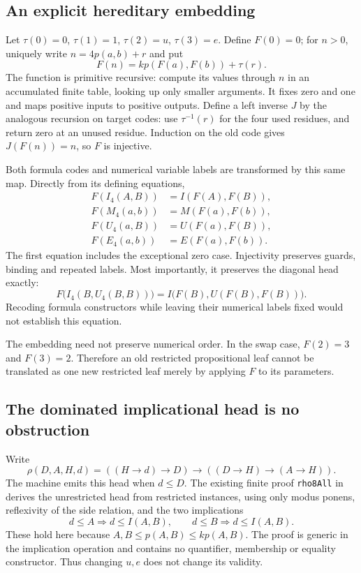 \subsection{An explicit hereditary embedding}

Let $\tau(0)=0$, $\tau(1)=1$, $\tau(2)=u$, $\tau(3)=e$. Define $F(0)=0$;
for $n>0$, uniquely write $n=4p(a,b)+r$ and put
\[
 F(n)=kp(F(a),F(b))+\tau(r).
\]
The function is primitive recursive: compute its values through $n$ in an
accumulated finite table, looking up only smaller arguments. It fixes zero
and one and maps positive inputs to positive outputs. Define a left inverse
$J$ by the analogous recursion on target codes: use $\tau^{-1}(r)$ for
the four used residues, and return zero at an unused residue. Induction on
the old code gives $J(F(n))=n$, so $F$ is injective.

Both formula codes and numerical variable labels are transformed by this
same map. Directly from its defining equations,
\begin{align*}
 F(I_4(A,B))&=I(F(A),F(B)),\\
 F(M_4(a,b))&=M(F(a),F(b)),\\
 F(U_4(a,B))&=U(F(a),F(B)),\\
 F(E_4(a,b))&=E(F(a),F(b)).
\end{align*}
The first equation includes the exceptional zero case. Injectivity preserves
guards, binding and repeated labels. Most importantly, it preserves the
diagonal head exactly:
\[
 F\bigl(I_4(B,U_4(B,B))\bigr)
   =I\bigl(F(B),U(F(B),F(B))\bigr).
\]
Recoding formula constructors while leaving their numerical labels fixed
would not establish this equation.

The embedding need not preserve numerical order. In the swap case,
$F(2)=3$ and $F(3)=2$. Therefore an old restricted propositional leaf cannot
be translated as one new restricted leaf merely by applying $F$ to its
parameters.

\subsection{The dominated implicational head is no obstruction}

Write
\[
 \rho(D,A,H,d)=((H\to d)\to D)\to((D\to H)\to(A\to H)).
\]
The machine emits this head when $d\le D$. The existing finite proof
\texttt{rho8All} in 
\cite{restricted-implication} derives the
unrestricted head from restricted instances, using only modus ponens,
reflexivity of the side relation, and the two implications
\[
 d\le A\Longrightarrow d\le I(A,B),\qquad
 d\le B\Longrightarrow d\le I(A,B).
\]
These hold here because $A,B\le p(A,B)\le kp(A,B)$. The proof is generic
in the implication operation and contains no quantifier, membership or
equality constructor. Thus changing $u,e$ does not change its validity.

